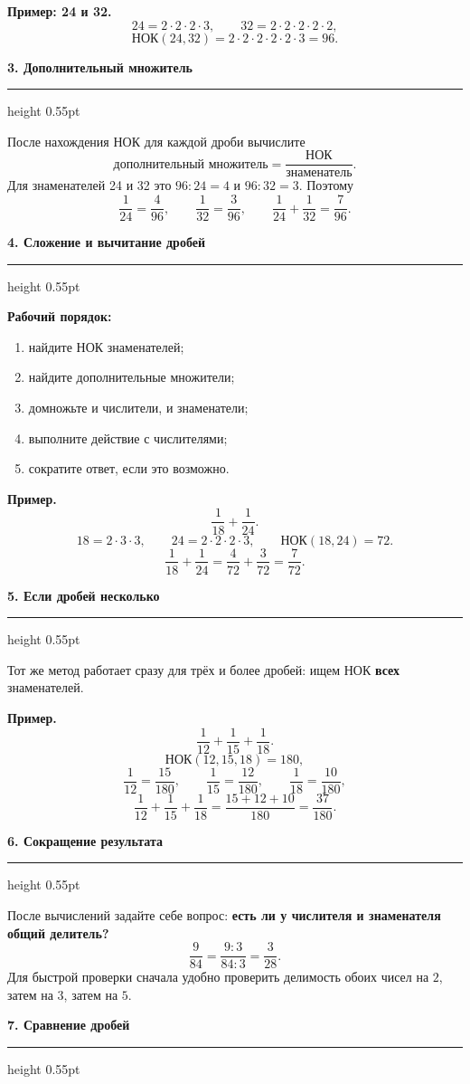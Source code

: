 \documentclass[a4paper,12pt]{article}
\newcommand{\sectiontitle}[1]{%
  \vspace{0.2em}%
  {\large\bfseries\color{darkaccent}#1}\par
  \vspace{0.08em}\hrule height 0.55pt\vspace{0.42em}%
}
\newcommand{\key}[1]{\textbf{\color{darkaccent}#1}}
\begin{document}
\textbf{Пример: 24 и 32.}
\[
24=2\cdot2\cdot2\cdot3,
\qquad
32=2\cdot2\cdot2\cdot2\cdot2,
\]
\[
\text{НОК}(24,32)=2\cdot2\cdot2\cdot2\cdot2\cdot3=96.
\]

\sectiontitle{3. Дополнительный множитель}

После нахождения НОК для каждой дроби вычислите
\[
\text{дополнительный множитель}=\frac{\text{НОК}}{\text{знаменатель}}.
\]
Для знаменателей 24 и 32 это $96:24=4$ и $96:32=3$. Поэтому
\[
\frac1{24}=\frac4{96},\qquad
\frac1{32}=\frac3{96},
\qquad
\frac1{24}+\frac1{32}=\frac7{96}.
\]

\clearpage

\sectiontitle{4. Сложение и вычитание дробей}

\textbf{Рабочий порядок:}
\begin{enumerate}
  \item найдите НОК знаменателей;
  \item найдите дополнительные множители;
  \item домножьте и числители, и знаменатели;
  \item выполните действие с числителями;
  \item сократите ответ, если это возможно.
\end{enumerate}

\textbf{Пример.}
\[
\frac1{18}+\frac1{24}.
\]
\[
18=2\cdot3\cdot3,\qquad 24=2\cdot2\cdot2\cdot3,
\qquad \text{НОК}(18,24)=72.
\]
\[
\frac1{18}+\frac1{24}
=\frac4{72}+\frac3{72}
=\frac7{72}.
\]

\sectiontitle{5. Если дробей несколько}

Тот же метод работает сразу для трёх и более дробей: ищем НОК \key{всех} знаменателей.

\textbf{Пример.}
\[
\frac1{12}+\frac1{15}+\frac1{18}.
\]
\[
\text{НОК}(12,15,18)=180,
\]
\[
\frac1{12}=\frac{15}{180},\qquad
\frac1{15}=\frac{12}{180},\qquad
\frac1{18}=\frac{10}{180},
\]
\[
\frac1{12}+\frac1{15}+\frac1{18}
=\frac{15+12+10}{180}
=\frac{37}{180}.
\]

\sectiontitle{6. Сокращение результата}

После вычислений задайте себе вопрос: \key{есть ли у числителя и знаменателя общий делитель?}
\[
\frac9{84}=\frac{9:3}{84:3}=\frac3{28}.
\]
Для быстрой проверки сначала удобно проверить делимость обоих чисел на $2$, затем на $3$, затем на $5$.

\clearpage

\sectiontitle{7. Сравнение дробей}
\end{document}
